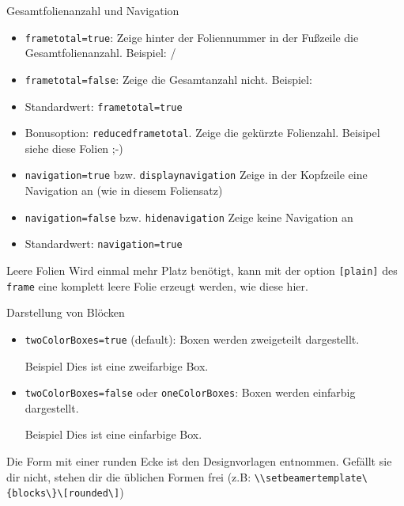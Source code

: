 \documentclass[german,10pt,xcolor=colortbl,compress
]{beamer}
\begin{document}
\begin{frame}{Gesamtfolienanzahl und Navigation}
	\begin{itemize}
		\item \lstinline|frametotal=true|: Zeige hinter der Foliennummer in der Fußzeile die Gesamtfolienanzahl. Beispiel: \insertframenumber{}/\inserttotalframenumber
		\item \lstinline|frametotal=false|: Zeige die Gesamtanzahl nicht. Beispiel: \insertframenumber{}
		\item Standardwert: \lstinline|frametotal=true|
		\item Bonusoption: \lstinline|reducedframetotal|. Zeige die gekürzte Folienzahl. Beisipel siehe diese Folien ;-)
	\end{itemize}
	\vspace{\baselineskip}
	\begin{itemize}
		\item \lstinline|navigation=true| bzw. \lstinline|displaynavigation| Zeige in der Kopfzeile eine Navigation an (wie in diesem Foliensatz)
		\item \lstinline|navigation=false| bzw. \lstinline|hidenavigation| Zeige keine Navigation an
		\item Standardwert: \lstinline|navigation=true|
	\end{itemize}
\end{frame}
\begin{frame}[plain]{Leere Folien}
	Wird einmal mehr Platz benötigt, kann mit der option \lstinline|[plain]| des \lstinline|frame| eine komplett leere Folie erzeugt werden, wie diese hier.
\end{frame}
\begin{frame}{Darstellung von Blöcken}
	\begin{itemize}
		\item \lstinline!twoColorBoxes=true! (default): Boxen werden zweigeteilt dargestellt.
		      \begin{block}{Beispiel}
			      Dies ist eine zweifarbige Box.
		      \end{block}
		\item \lstinline!twoColorBoxes=false! oder \lstinline!oneColorBoxes!: Boxen werden einfarbig dargestellt.
		      \begin{block}{Beispiel}
			      Dies ist eine einfarbige Box.
		      \end{block}
	\end{itemize}
	Die Form mit einer runden Ecke ist den Designvorlagen entnommen. Gefällt sie dir nicht, stehen dir die üblichen Formen frei (z.B: \lstinline!\\setbeamertemplate\{blocks\}\[rounded\]!)
\end{frame}
\end{document}
